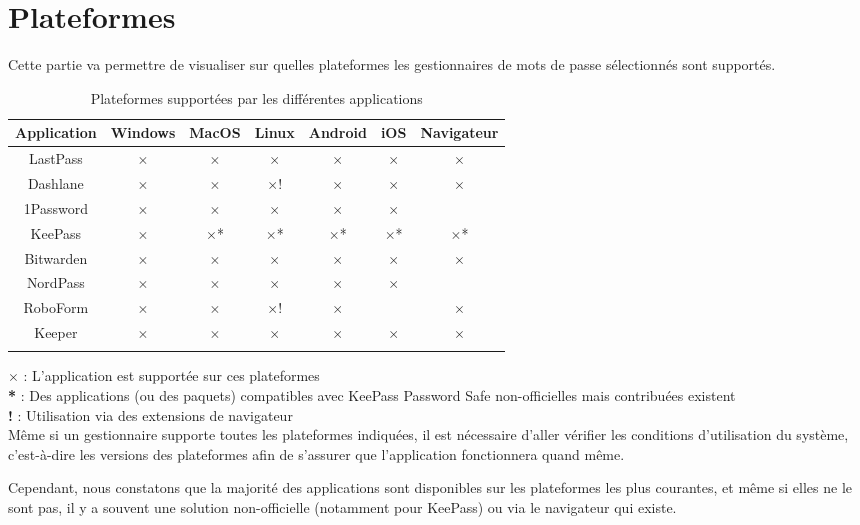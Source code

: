 \section{Plateformes}
Cette partie va permettre de visualiser sur quelles plateformes les gestionnaires de mots de passe sélectionnés sont supportés. \\
\begin{longtable}[h]{|c|c|c|c|c|c|c|}
	\hline
	Application & Windows & MacOS & Linux & Android & iOS & Navigateur  \\
	\hline
	LastPass & $\times$ & $\times$ & $\times$ & $\times$ & $\times$ &  $\times$\\
		\hline
	Dashlane & $\times$ & $\times$ & $\times$! & $\times$ & $\times$ & $\times$  \\
		\hline
	1Password & $\times$ & $\times$ & $\times$ & $\times$ & $\times$& \\
	\hline
	KeePass & $\times$ & $\times$* & $\times$*  & $\times$* & $\times$* &  $\times$*  \\
		\hline
	Bitwarden & $\times$ & $\times$  & $\times$ & $\times$ & $\times$ & $\times$  \\
		\hline
	NordPass & $\times$ & $\times$ & $\times$  & $\times$ & $\times$ &  \\
		\hline
	RoboForm & $\times$ & $\times$ & $\times$! & $\times$ & & $\times$ \\
		\hline
	Keeper & $\times$ & $\times$ & $\times$ & $\times$ &$\times$ & $\times$ \\
		\hline
	\caption{Plateformes supportées par les différentes applications}
\end{longtable}
$\times$ : L'application est supportée sur ces plateformes \\
\textbf{*}\hspace{0.1cm} :  Des applications (ou des paquets) compatibles avec KeePass Password Safe non-officielles mais contribuées existent \\
\textbf{!}\hspace{0.18cm} : Utilisation via des extensions de navigateur \\

Même si un gestionnaire supporte toutes les plateformes indiquées, il est nécessaire d'aller vérifier les conditions d'utilisation du système, c'est-à-dire les versions des plateformes afin de s'assurer que l'application fonctionnera quand même. 

Cependant, nous constatons que la majorité des applications sont disponibles sur les plateformes les plus courantes, et même si elles ne le sont pas, il y a souvent une solution non-officielle (notamment pour KeePass) ou via le navigateur qui existe.
